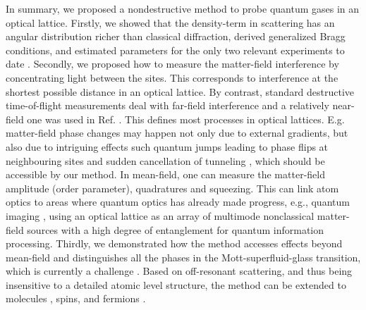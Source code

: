 In summary, we proposed a nondestructive method to probe quantum gases
in an optical lattice. Firstly, we showed that the density-term in
scattering has an angular distribution richer than classical
diffraction, derived generalized Bragg conditions, and estimated
parameters for the only two relevant experiments to date
\cite{weitenberg2011, miyake2011}. Secondly, we proposed how to
measure the matter-field interference by concentrating light between
the sites. This corresponds to interference at the shortest possible
distance in an optical lattice. By contrast, standard destructive
time-of-flight measurements deal with far-field interference and a
relatively near-field one was used in Ref. \cite{miyake2011}. This
defines most processes in optical lattices. E.g. matter-field phase
changes may happen not only due to external gradients, but also due to
intriguing effects such quantum jumps leading to phase flips at
neighbouring sites and sudden cancellation of tunneling
\cite{vukics2007}, which should be accessible by our method. In
mean-field, one can measure the matter-field amplitude (order
parameter), quadratures and squeezing. This can link atom optics to
areas where quantum optics has already made progress, e.g., quantum
imaging \cite{golubev2010, kolobov1999}, using an optical lattice as
an array of multimode nonclassical matter-field sources with a high
degree of entanglement for quantum information processing. Thirdly, we
demonstrated how the method accesses effects beyond mean-field and
distinguishes all the phases in the Mott-superfluid-glass transition,
which is currently a challenge \cite{derrico2014}. Based on
off-resonant scattering, and thus being insensitive to a detailed
atomic level structure, the method can be extended to molecules
\cite{LP2013}, spins, and fermions \cite{ruostekoski2009}.
